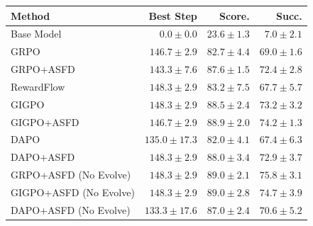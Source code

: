 \begin{tabular}{lrrr}
\toprule
Method & Best Step & Score. & Succ. \\
\midrule
Base Model & $0.0 \pm 0.0$ & $23.6 \pm 1.3$ & $7.0 \pm 2.1$ \\
GRPO & $146.7 \pm 2.9$ & $82.7 \pm 4.4$ & $69.0 \pm 1.6$ \\
GRPO+ASFD & $143.3 \pm 7.6$ & $87.6 \pm 1.5$ & $72.4 \pm 2.8$ \\
RewardFlow & $148.3 \pm 2.9$ & $83.2 \pm 7.5$ & $67.7 \pm 5.7$ \\
GIGPO & $148.3 \pm 2.9$ & $88.5 \pm 2.4$ & $73.2 \pm 3.2$ \\
GIGPO+ASFD & $146.7 \pm 2.9$ & $88.9 \pm 2.0$ & $74.2 \pm 1.3$ \\
DAPO & $135.0 \pm 17.3$ & $82.0 \pm 4.1$ & $67.4 \pm 6.3$ \\
DAPO+ASFD & $148.3 \pm 2.9$ & $88.0 \pm 3.4$ & $72.9 \pm 3.7$ \\
GRPO+ASFD (No Evolve) & $148.3 \pm 2.9$ & $89.0 \pm 2.1$ & $75.8 \pm 3.1$ \\
GIGPO+ASFD (No Evolve) & $148.3 \pm 2.9$ & $89.0 \pm 2.8$ & $74.7 \pm 3.9$ \\
DAPO+ASFD (No Evolve) & $133.3 \pm 17.6$ & $87.0 \pm 2.4$ & $70.6 \pm 5.2$ \\
\bottomrule
\end{tabular}
